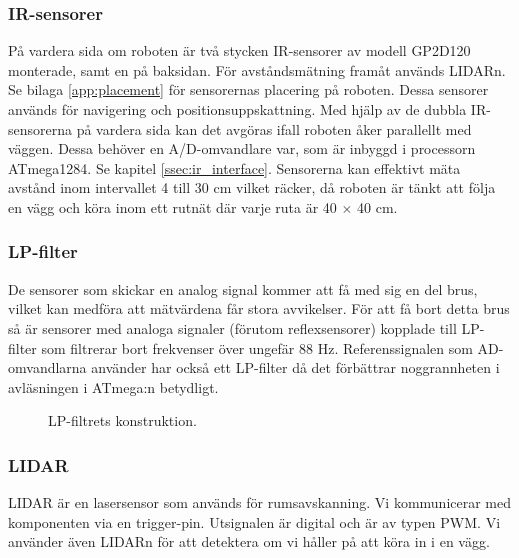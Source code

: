 \documentclass[a4paper,11pt]{article}
\begin{document}
\subsubsection{IR-sensorer} \label{sssec:sonicsensors}
På vardera sida om roboten är två stycken IR-sensorer av modell GP2D120 monterade, samt en på baksidan. För avståndsmätning framåt används LIDARn. Se bilaga \ref{app:placement} för sensorernas placering på roboten. Dessa sensorer används för navigering och positionsuppskattning. Med hjälp av de dubbla IR-sensorerna på vardera sida kan det avgöras ifall roboten åker parallellt med väggen. Dessa behöver en A/D-omvandlare var, som är inbyggd i processorn ATmega1284. Se kapitel \ref{ssec:ir_interface}. Sensorerna kan effektivt mäta avstånd inom intervallet 4 till 30 cm vilket räcker, då roboten är tänkt att följa en vägg och köra inom ett rutnät där varje ruta är 40 $\times$ 40 cm.

\subsubsection{LP-filter}
De sensorer som skickar en analog signal kommer att få med sig en del brus, vilket kan medföra att mätvärdena får stora avvikelser. För att få bort detta brus så är sensorer med analoga signaler (förutom reflexsensorer) kopplade till LP-filter som filtrerar bort frekvenser över ungefär 88 \si{\hertz}. Referenssignalen som AD-omvandlarna använder har också ett LP-filter då det förbättrar noggrannheten i avläsningen i ATmega:n betydligt.

\begin{figure}[h!]
	\caption{LP-filtrets konstruktion.}
	\label{fig:lpFilter}
\end{figure}

\subsubsection{LIDAR} \label{sssec:lidar}
LIDAR är en lasersensor som används för rumsavskanning. Vi kommunicerar med komponenten via en trigger-pin. Utsignalen är digital och är av typen PWM. Vi använder även LIDARn för att detektera om vi håller på att köra in i en vägg.
\end{document}
